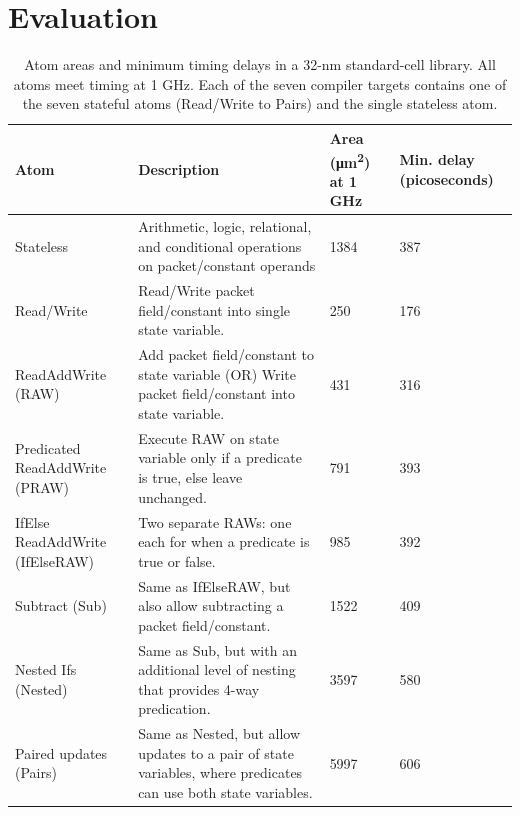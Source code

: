 \section{Evaluation}
\label{s:eval}

\begin{table}[!t]
  \begin{scriptsize}
  \begin{tabular}{|p{}|p{}|p{}|p{}|}
    \hline
    Atom & Description & Area (\si{\micro\metre\squared}) at 1 GHz & Min. delay (picoseconds) \\
    \hline
    Stateless & Arithmetic, logic, relational, and conditional operations on packet/constant operands & 1384 & 387 \\
    \hline
    Read/Write & Read/Write packet field/constant into single state variable. & 250 & 176 \\
    \hline
    ReadAddWrite (RAW) & Add packet field/constant to state variable (OR) Write packet field/constant into state variable. & 431 & 316 \\
    \hline
    Predicated ReadAddWrite (PRAW) & Execute RAW on state variable only if a predicate is true, else leave unchanged. & 791 & 393 \\
    \hline
    IfElse ReadAddWrite (IfElseRAW) & Two separate RAWs: one each for when a predicate is true or false. & 985 & 392 \\
    \hline
    Subtract (Sub) & Same as IfElseRAW, but also allow subtracting a packet field/constant. & 1522 & 409 \\
    \hline
    Nested Ifs (Nested) & Same as Sub, but with an additional level of nesting that provides 4-way predication. & 3597 & 580 \\
    \hline
    Paired updates (Pairs) & Same as Nested, but allow updates to a pair of state variables, where predicates can use both state variables. & 5997 & 606 \\
    \hline
  \end{tabular}
  \end{scriptsize}
  \caption{Atom areas and minimum timing delays in a 32-nm standard-cell
  library.  All atoms meet timing at 1 GHz. Each of the seven compiler targets
  contains one of the seven stateful atoms (Read/Write to Pairs) and the
  single stateless atom.}
  \label{tab:templates}
\end{table}


